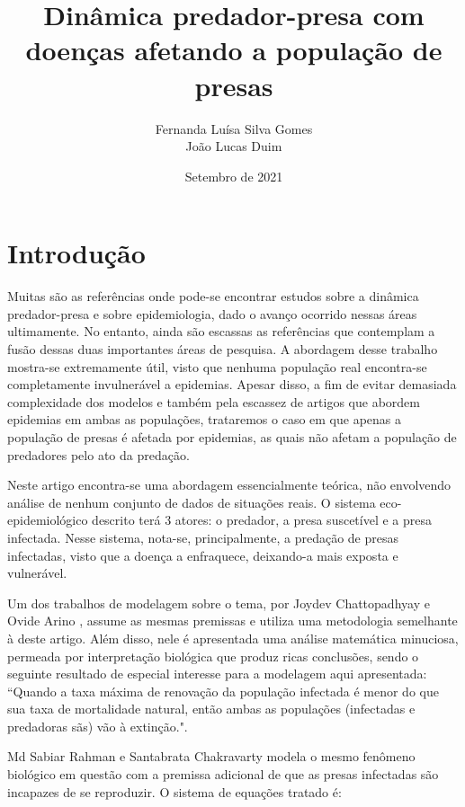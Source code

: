 \documentclass{article}
\title{Dinâmica predador-presa com doenças afetando a população de presas}
\author{Fernanda Luísa Silva Gomes \\ João Lucas Duim}
\date{Setembro de 2021}
\begin{document}
\maketitle

\section{Introdução}
Muitas são as referências onde pode-se encontrar estudos sobre a dinâmica predador-presa e sobre epidemiologia, dado o avanço ocorrido nessas áreas ultimamente. No entanto, ainda são escassas as referências que contemplam a fusão dessas duas importantes áreas de pesquisa. A abordagem desse trabalho mostra-se extremamente útil, visto que nenhuma população real encontra-se completamente invulnerável a epidemias. Apesar disso, a fim de evitar demasiada complexidade dos modelos e também pela escassez de artigos que abordem epidemias em ambas as populações, trataremos o caso em que apenas a população de presas é afetada por epidemias, as quais não afetam a população de predadores pelo ato da predação.

Neste artigo encontra-se uma abordagem essencialmente teórica, não envolvendo análise de nenhum conjunto de dados de situações reais. O sistema eco-epidemiológico descrito terá $3$ atores: o predador, a presa suscetível e a presa infectada. Nesse sistema, nota-se, principalmente, a predação de presas infectadas, visto que a doença a enfraquece, deixando-a mais exposta e vulnerável.

Um dos trabalhos de modelagem sobre o tema, por  Joydev Chattopadhyay e Ovide Arino \cite{chattopadhyay}, assume as mesmas premissas e utiliza uma metodologia semelhante à deste artigo. Além disso, nele é apresentada uma análise matemática minuciosa, permeada por interpretação biológica que produz ricas conclusões, sendo o seguinte resultado de especial interesse para a modelagem aqui apresentada: ``Quando a taxa máxima de renovação da população infectada é menor do que sua taxa de mortalidade natural, então ambas as populações (infectadas e predadoras sãs) vão à extinção.".

Md Sabiar Rahman e Santabrata Chakravarty \cite{rahman} modela o mesmo fenômeno biológico em questão com a premissa adicional de que as presas infectadas são incapazes de se reproduzir. O sistema de equações tratado é:
\end{document}
